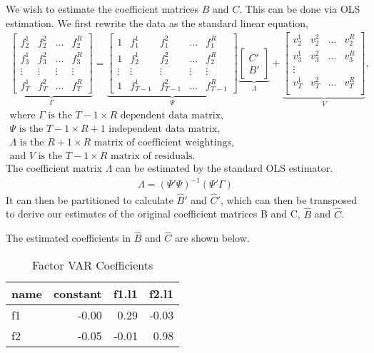 \documentclass[11pt, letterpaper]{article}\usepackage[]{graphicx}\usepackage[]{color}
\begin{document}
We wish to estimate the coefficient matrices $B$ and $C$. This can be done via OLS estimation. We first rewrite the data as the standard linear equation,
\begin{align*}
\underbrace{\begin{bmatrix}
f^1_{2} & f^2_{2} & \dots & f^R_{2}\\
f^1_{3} & f^2_{3} & \dots & f^R_{3}\\
\vdots & \vdots & \vdots & \vdots \\
f^1_{T} & f^2_{T} & \dots & f^R_{T}
\end{bmatrix}}_{\Gamma}
=
\underbrace{\begin{bmatrix}
1 & f^1_{1} & f^2_{1} & \dots & f^R_{1}\\
1 & f^1_{2} & f^2_{2} & \dots & f^R_{2}\\
\vdots & \vdots & \vdots & \vdots & \vdots \\
1 & f^1_{T-1} & f^2_{T-1} & \dots & f^R_{T-1}
\end{bmatrix}}_{\Psi}
\underbrace{\begin{bmatrix}
C'\\
B'
\end{bmatrix}}_{\Lambda}
 +
\underbrace{\begin{bmatrix}
v^1_2 & v^2_2 & \dots & v^R_2\\
v^1_3 & v^2_3 & \dots & v^R_3\\
\vdots\\
v^1_T & v^2_T & \dots & v^R_T\\
\end{bmatrix}}_{V},\\
\text{where $\Gamma$ is the $T-1 \times R$ dependent data matrix,}\\
\text{$\Psi$ is the $T-1 \times R+1$ independent data matrix,}\\
\text{$\Lambda$ is the $R+1 \times R$ matrix of coefficient weightings,}\\
\text{and $V$ is the $T-1 \times R$ matrix of residuals.}
\end{align*}
The coefficient matrix $\Lambda$ can be estimated by the standard OLS estimator.
\begin{align*}
\widehat{\Lambda} = (\Psi' \Psi)^{-1} (\Psi'\Gamma)
\end{align*}
It can then be partitioned to calculate $\widehat{B}'$ and $\widehat{C}'$, which can then be transposed to derive our estimates of the original coefficient matrices B and C, $\widehat{B}$ and $\widehat{C}$.

The estimated coefficients in $\widehat{B}$ and $\widehat{C}$ are shown below.
\begin{table}[H]
\centering
\begingroup\footnotesize
\begin{tabular}{lrrr}
  \hline
name & constant & f1.l1 & f2.l1 \\ 
  \hline
f1 & -0.00 & 0.29 & -0.03 \\ 
  f2 & -0.05 & -0.01 & 0.98 \\ 
   \hline
\end{tabular}
\endgroup
\caption{Factor VAR Coefficients} 
\end{table}
\end{document}
